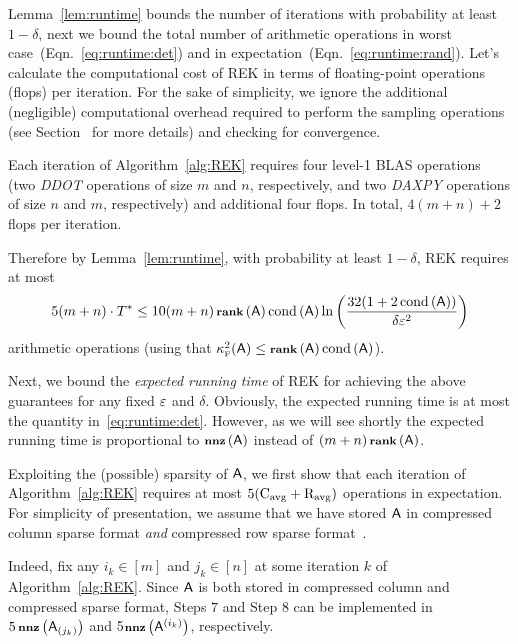 Lemma~\ref{lem:runtime} bounds the number of iterations with probability at least $1-\delta$, next we bound the total number of arithmetic operations in worst case~(Eqn.~\eqref{eq:runtime:det}) and in expectation~(Eqn.~\eqref{eq:runtime:rand}). Let's calculate the computational cost of REK in terms of floating-point operations (flops) per iteration. For the sake of simplicity, we ignore the additional (negligible) computational overhead required to perform the sampling operations (see Section~\cite{REK} for more details) and checking for convergence.

Each iteration of Algorithm~\ref{alg:REK} requires four level-1 BLAS operations (two \emph{DDOT} operations of size $m$ and $n$, respectively, and two \emph{DAXPY} operations of size $n$ and $m$, respectively) and additional four flops. In total, $4(m+n)+2$ flops per iteration.
%

%
Therefore by Lemma~\ref{lem:runtime}, with probability at least $1-\delta$, REK requires at most
\begin{equation}\label{eq:runtime:det}
5 (m +n ) \cdot T^* \leq  10 (m+n) \operatorname{\textbf{{\footnotesize rank}}}\left({\mathsf{A} }\right)  \operatorname{\mathrm{cond}}\left({\mathsf{A} }\right) \ln \left(\frac{32(1+2\operatorname{\mathrm{cond}}\left({\mathsf{A} }\right))}{\delta\varepsilon^2}\right)
\end{equation}
arithmetic operations (using that $\kappa^2_{\textrm{\tiny F}}({\mathsf{A} }) \leq \operatorname{\textbf{{\footnotesize rank}}}\left({\mathsf{A} }\right) \operatorname{\mathrm{cond}}\left({\mathsf{A} }\right)$).
%

%
Next, we bound the \emph{expected running time} of REK for achieving the above guarantees for any fixed $\varepsilon$ and $\delta$. Obviously, the expected running time is at most the quantity in~\eqref{eq:runtime:det}. However, as we will see shortly the expected running time is proportional to $\operatorname{\textbf{\footnotesize nnz}}\left({\mathsf{A} }\right)$ instead of $(m+n)\operatorname{\textbf{{\footnotesize rank}}}\left({\mathsf{A} }\right)$.

Exploiting the (possible) sparsity of ${\mathsf{A} }$, we first show that each iteration of Algorithm~\ref{alg:REK} requires at most $5(\mathrm{C}_{\mathrm{avg}} + \mathrm{R}_{\mathrm{avg}})$ operations in expectation. For simplicity of presentation, we assume that we have stored ${\mathsf{A} }$ in compressed column sparse format \emph{and} compressed row sparse format~\cite{book:templates}.

Indeed, fix any $i_k\in{[m]}$ and $j_k\in{[n]}$ at some iteration $k$ of Algorithm~\ref{alg:REK}. Since ${\mathsf{A} }$ is both stored in compressed column and compressed sparse format, Steps $7$ and Step $8$ can be implemented in $5 \operatorname{\textbf{\footnotesize nnz}}\left({\mathsf{A} }_{(j_k)}\right)$ and 5$\operatorname{\textbf{\footnotesize nnz}}\left({\mathsf{A} }^{(i_k)}\right)$, respectively.

